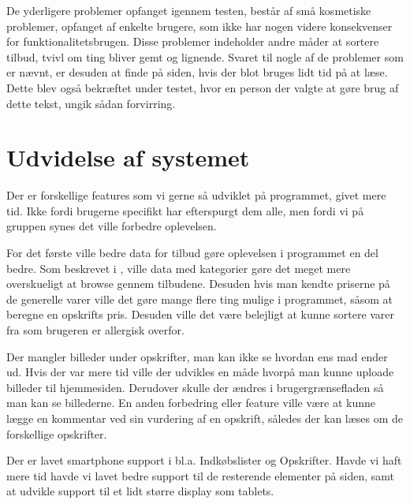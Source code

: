 De yderligere problemer opfanget igennem testen, består af små kosmetiske problemer, opfanget af enkelte brugere, som ikke har nogen videre konsekvenser for funktionalitetsbrugen.
Disse problemer indeholder andre måder at sortere tilbud, tvivl om ting bliver gemt og lignende.
Svaret til nogle af de problemer som er nævnt, er desuden at finde på siden, hvis der blot bruges lidt tid på at læse.
Dette blev også bekræftet under testet, hvor en person der valgte at gøre brug af dette tekst, ungik sådan forvirring.


\section{Udvidelse af systemet}\label{udvidelse}

Der er forskellige features som vi gerne så udviklet på programmet, givet mere tid. Ikke fordi brugerne specifikt har efterspurgt dem alle, men fordi vi på gruppen synes det ville forbedre oplevelsen.

For det første ville bedre data for tilbud gøre oplevelsen i programmet en del bedre.
Som beskrevet i , ville data med kategorier gøre det meget mere overskueligt at browse gennem tilbudene. 
Desuden hvis man kendte priserne på de generelle varer ville det gøre mange flere ting mulige i programmet, såsom at beregne en opskrifts pris. 
Desuden ville det være belejligt at kunne sortere varer fra som brugeren er allergisk overfor.

Der mangler billeder under opskrifter, man kan ikke se hvordan ens mad ender ud.
Hvis der var mere tid ville der udvikles en måde hvorpå man kunne uploade billeder til hjemmesiden. 
Derudover skulle der ændres i brugergrænsefladen så man kan se billederne.
En anden forbedring eller feature ville være at kunne lægge en kommentar ved sin vurdering af en opskrift, således der kan læses om de forskellige opskrifter. 

Der er lavet smartphone support i bl.a. Indkøbslister og Opskrifter.
Havde vi haft mere tid havde vi lavet bedre support til de resterende elementer på siden, samt at udvikle support til et lidt større display som tablets.
